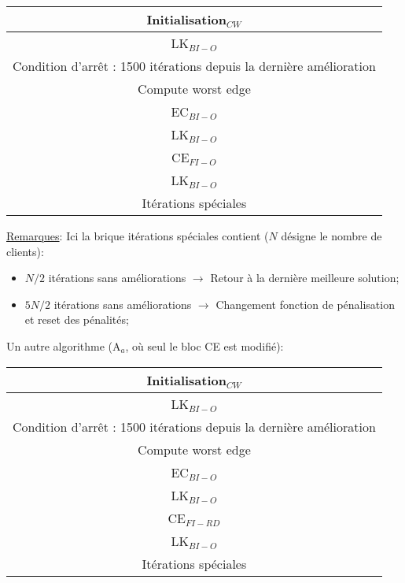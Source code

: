 \documentclass[a4paper,11pt]{article}%
\begin{document}
\begin{center}
\begin{tabular}{|c|}

   \hline
   Initialisation$_{CW}$  \\
   \hline
   LK$_{BI-O}$ \\
   \hline
   \hline
   Condition d'arrêt : 1500 itérations depuis la dernière amélioration  \\
   \hline
   Compute worst edge \\
   \hline
   EC$_{BI-O}$ \\
   \hline
   LK$_{BI-O}$ \\
   \hline
   CE$_{FI-O}$ \\
   \hline
   LK$_{BI-O}$ \\
   \hline
   Itérations spéciales \\
   \hline
   \hline
   
\end{tabular}
\end{center}

\underline{Remarques}: Ici la brique itérations spéciales contient ($N$ désigne le nombre de clients):
\begin{itemize}
\item $N/2$ itérations sans améliorations $\rightarrow$ Retour à la dernière meilleure solution;
\item $5N/2$ itérations sans améliorations $\rightarrow$ Changement fonction de pénalisation et reset des pénalités;
\end{itemize} 


Un autre algorithme (A$_a$, où seul le bloc CE est modifié):
\begin{center}
\begin{tabular}{|c|}

   \hline
   Initialisation$_{CW}$  \\
   \hline
   LK$_{BI-O}$ \\
   \hline
   \hline
   Condition d'arrêt : 1500 itérations depuis la dernière amélioration  \\
   \hline
   Compute worst edge \\
   \hline
   EC$_{BI-O}$ \\
   \hline
   LK$_{BI-O}$ \\
   \hline
   CE$_{FI-RD}$ \\
   \hline
   LK$_{BI-O}$ \\
   \hline
   Itérations spéciales \\
   \hline
   \hline
   
\end{tabular}
\end{center}
\end{document}
